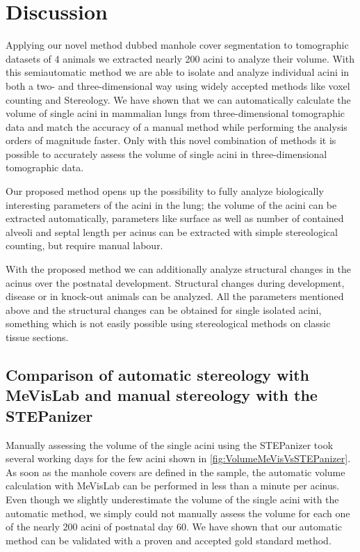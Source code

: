\documentclass[%
	twoside,
	paper=a4,%
	abstract=true,%
	]{scrartcl}
\begin{document}
\section{Discussion}
Applying our novel method dubbed manhole cover segmentation to tomographic datasets of 4 animals we extracted nearly 200 acini to analyze their volume. With this semiautomatic method we are able to isolate and analyze individual acini in both a two- and three-dimensional way using widely accepted methods like voxel counting and Stereology. We have shown that we can automatically calculate the volume of single acini in mammalian lungs from three-dimensional tomographic data and match the accuracy of a manual method while performing the analysis orders of magnitude faster. Only with this novel combination of methods it is possible to accurately assess the volume of single acini in three-dimensional tomographic data.

Our proposed method opens up the possibility to fully analyze biologically interesting parameters of the acini in the lung; the volume of the acini can be extracted automatically, parameters like surface as well as number of contained alveoli and septal length per acinus can be extracted with simple stereological counting, but require manual labour. 

With the proposed method we can additionally analyze structural changes in the acinus over the postnatal development. Structural changes during development, disease or in knock-out animals can be analyzed. All the parameters mentioned above and the structural changes can be obtained for single isolated acini, something which is not easily possible using stereological methods on classic tissue sections.

\subsection[Comparison of MeVisLab with STEPanizer]{Comparison of automatic stereology with MeVisLab and manual stereology with the STEPanizer}
Manually assessing the volume of the single acini using the STEPanizer took several working days for the few acini shown in \autoref{fig:VolumeMeVisVsSTEPanizer}. As soon as the manhole covers are defined in the sample, the automatic volume calculation with MeVisLab can be performed in less than a minute per acinus. Even though we slightly underestimate the volume of the single acini with the automatic method, we simply could not manually assess the volume for each one of the nearly 200 acini of postnatal day 60. We have shown that our automatic method can be validated with a proven and accepted gold standard method.
\end{document}
